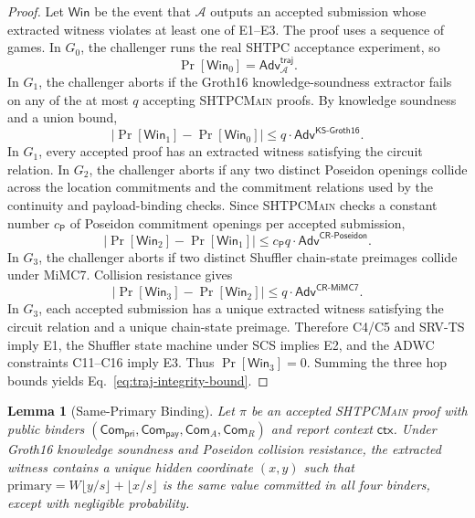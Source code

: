 \documentclass[journal]{IEEEtran}
\theoremstyle{definition}
\theoremstyle{plain}
\newtheorem{lemma}{Lemma}
\begin{document}
\begin{proof}
  Let \(\mathsf{Win}\) be the event that \(\mathcal{A}\) outputs an accepted
  submission whose extracted witness violates at least one of E1--E3. The proof uses a
  sequence of games. In \(G_0\), the challenger runs the real \textsc{SHTPC}
  acceptance experiment, so
  \[
    \Pr[\mathsf{Win}_0]=\mathsf{Adv}^{\mathsf{traj}}_{\mathcal{A}}.
  \]
  In \(G_1\), the challenger aborts if the Groth16 knowledge-soundness extractor
  fails on any of the at most \(q\) accepting \textsc{SHTPCMain} proofs. By
  knowledge soundness and a union bound,
  \[
    |\Pr[\mathsf{Win}_1]-\Pr[\mathsf{Win}_0]|
    \le q\cdot\mathsf{Adv}^{\mathsf{KS\text{-}Groth16}}.
  \]
  In \(G_1\), every accepted proof has an extracted witness satisfying the
  circuit relation. In \(G_2\), the challenger aborts if any two distinct
  Poseidon openings collide across the location commitments and the commitment
  relations used by the continuity and payload-binding checks. Since
  \textsc{SHTPCMain} checks a constant number \(c_{\mathsf{P}}\) of Poseidon
  commitment openings per accepted submission,
  \[
    |\Pr[\mathsf{Win}_2]-\Pr[\mathsf{Win}_1]|
    \le c_{\mathsf{P}}q\cdot\mathsf{Adv}^{\mathsf{CR\text{-}Poseidon}}.
  \]
  In \(G_3\), the challenger aborts if two distinct Shuffler chain-state
  preimages collide under MiMC7. Collision resistance gives
  \[
    |\Pr[\mathsf{Win}_3]-\Pr[\mathsf{Win}_2]|
    \le q\cdot\mathsf{Adv}^{\mathsf{CR\text{-}MiMC7}}.
  \]
  In \(G_3\), each accepted submission has a unique extracted witness satisfying
  the circuit relation and a unique chain-state preimage. Therefore C4/C5 and
  SRV-TS imply E1, the Shuffler state machine under SCS implies E2, and the
  ADWC constraints C11--C16 imply E3. Thus \(\Pr[\mathsf{Win}_3]=0\). Summing the
  three hop bounds yields Eq.~\eqref{eq:traj-integrity-bound}.
\end{proof}

\begin{lemma}[Same-Primary Binding]
  \label{lem:same-primary}
  Let $\pi$ be an accepted \textsc{SHTPCMain} proof with public binders
  $(\mathsf{Com}_{\mathsf{pri}},\mathsf{Com}_{\mathsf{pay}},\mathsf{Com}_{A},
  \mathsf{Com}_{R})$ and report context $\mathsf{ctx}$. Under Groth16 knowledge
  soundness and Poseidon collision resistance, the extracted witness contains a
  unique hidden coordinate $(x,y)$ such that
  $\mathrm{primary}=W\lfloor y/s\rfloor+\lfloor x/s\rfloor$ is the same
  value committed in all four binders, except with negligible probability.
\end{lemma}
\end{document}
